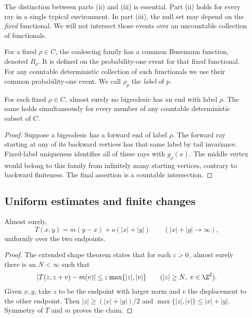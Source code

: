 The distinction between parts \textup{(ii)} and \textup{(iii)} is
essential. Part \textup{(ii)} holds for every ray in a single typical
environment. In part \textup{(iii)}, the null set may depend on the
\emph{fixed} functional. We will not intersect those events over an
uncountable collection of functionals.

For a fixed \(\rho\in C\), the coalescing family has a common Busemann
function, denoted \(B_\rho\). It is defined on the probability-one
event for that fixed functional. For any countable deterministic
collection of such functionals we use their common probability-one
event.
We call \(\rho_p\) the \emph{label} of \(p\).

\begin{corollary}
\label{cor:fixed-label}
For each fixed \(\rho\in C\), almost surely no bigeodesic has an end
with label \(\rho\). The same holds simultaneously for every member
of any countable deterministic subset of \(C\).
\end{corollary}
\begin{proof}
Suppose a bigeodesic has a forward end of label \(\rho\).
The forward ray starting at any of its backward vertices has that
same label by tail invariance. Fixed-label uniqueness identifies all
of these rays with \(g_\rho(x)\).
The middle vertex would belong to this family from infinitely many
starting vertices, contrary to backward finiteness.
The final assertion is a countable intersection.
\end{proof}

\subsection{Uniform estimates and finite changes}
\begin{lemma}\label{lem:uniform-metric}
Almost surely,
\begin{equation}\label{eq:uniform-metric}
 T(x,y)=m(y-x)+o(|x|+|y|)
 \qquad (|x|+|y|\to\infty),
\end{equation}
uniformly over the two endpoints.
\end{lemma}
\begin{proof}
The extended shape theorem
\cite[Proposition 3.4]{AhlbergHoffman} states that for each
\(\varepsilon>0\), almost surely there is an \(N<\infty\) such that
\[
 |T(z,z+v)-m(v)|\le\eps\max\{|z|,|v|\}
 \qquad (|z|\ge N,\ v\in\Z^2).
\]
Given \(x,y\), take \(z\) to be the endpoint with larger norm and \(v\)
the displacement to the other endpoint.
Then \(|z|\ge (|x|+|y|)/2\) and
\(\max\{|z|,|v|\}\le |x|+|y|\).
Symmetry of \(T\) and \(m\) proves the claim.
\end{proof}

